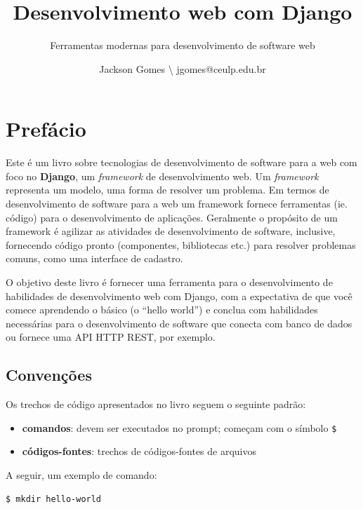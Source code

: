 \documentclass[brazil,a4paper,oneside,openright,parskip=full]{book}
\title{Desenvolvimento web com Django}
\subtitle{Ferramentas modernas para desenvolvimento de software web}
\author{Jackson Gomes \textbackslash{} jgomes@ceulp.edu.br}
\institute{Centro Universitário Luterano de Palmas \and Departamento de Computação \and  \and }
\date{}
\newcommand{\passthrough}[1]{#1}
\providecommand{\tightlist}{%
  \setlength{\itemsep}{0pt}\setlength{\parskip}{0pt}}
\begin{document}
\maketitle

\frontmatter

{
\hypersetup{linkcolor=}
\setcounter{tocdepth}{3}
\tableofcontents
}
\listoftables
\listoffigures
\lstlistoflistings

\hypertarget{prefuxe1cio}{%
\chapter{Prefácio}\label{prefuxe1cio}}

Este é um livro sobre tecnologias de desenvolvimento de software para a
web com foco no \textbf{Django}, um \emph{framework} de desenvolvimento
web. Um \emph{framework} representa um modelo, uma forma de resolver um
problema. Em termos de desenvolvimento de software para a web um
framework fornece ferramentas (ie. código) para o desenvolvimento de
aplicações. Geralmente o propósito de um framework é agilizar as
atividades de desenvolvimento de software, inclusive, fornecendo código
pronto (componentes, bibliotecas etc.) para resolver problemas comuns,
como uma interface de cadastro.

O objetivo deste livro é fornecer uma ferramenta para o desenvolvimento
de habilidades de desenvolvimento web com Django, com a expectativa de
que você comece aprendendo o básico (o ``hello world'') e conclua com
habilidades necessárias para o desenvolvimento de software que conecta
com banco de dados ou fornece uma API HTTP REST, por exemplo.

\hypertarget{convenuxe7uxf5es}{%
\section{Convenções}\label{convenuxe7uxf5es}}

Os trechos de código apresentados no livro seguem o seguinte padrão:

\begin{itemize}
\tightlist
\item
  \textbf{comandos}: devem ser executados no prompt; começam com o
  símbolo \passthrough{\lstinline!$!}
\item
  \textbf{códigos-fontes}: trechos de códigos-fontes de arquivos
\end{itemize}

A seguir, um exemplo de comando:

\begin{lstlisting}[language=sh, style=nonumber]
$ mkdir hello-world
\end{lstlisting}
\end{document}
